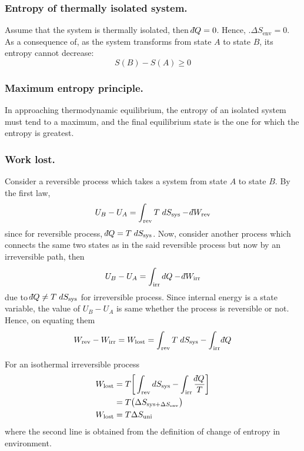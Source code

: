 \documentclass[../../../Main.tex]{subfiles}
\begin{document}
\subsubsection{Entropy of thermally isolated system.} Assume that the system is thermally isolated, then $\dbar Q = 0$. Hence, $.\Delta S_{\text{env}}=0$. As a consequence of, as the system transforms from state $A$ to state $B$, its entropy cannot decrease:
\begin{equation*}
    S(B)-S(A)\geq0
\end{equation*}

\subsubsection{Maximum entropy principle.} In approaching thermodynamic equilibrium, the entropy of an isolated system must tend to a maximum, and the final equilibrium state is the one for which the entropy is greatest.

\subsubsection{Work lost.} Consider a reversible process which takes a system from state $A$ to state $B$. By the first law, 
\begin{equation*}
    U_B-U_A=\int_{\text{rev}}T\;dS_{\text{sys}}-\dbar W_{\text{rev}}
\end{equation*}
since for reversible process, $\dbar Q=T\;dS_{\text{sys}}$. Now, consider another process which connects the same two states as in the said reversible process but now by an irreversible path, then
\begin{equation*}
    U_B-U_A=\int_{\text{irr}}dQ-\dbar W_{\text{irr}}
\end{equation*}
due to $\dbar Q\neq T\;dS_{\text{sys}}$ for irreversible process. Since internal energy is a state variable, the value of $U_B - U_A$ is same whether the process is reversible or not. Hence, on equating them 
\begin{equation*}
    W_{\text{rev}}-W_{\text{irr}}=W_{\text{lost}}= \int_{\text{rev}}T\;dS_{\text{sys}}-\int_{\text{irr}}\dbar Q
\end{equation*}

For an isothermal irreversible process
\begin{align*}
    W_{\text{lost}}&=T\bigg[ \int_{\text{rev}}dS_{\text{sys}}-\int_{\text{irr}}\frac{\dbar Q}{T} \bigg]\\
    &=T\big(\Delta S_{\text{sys}+\Delta S_{\text{env}}}\big)\\
    W_{\text{lost}}&=T\Delta S_\text{uni}
\end{align*}
where the second line is obtained from the definition of change of entropy in environment.
\end{document}
